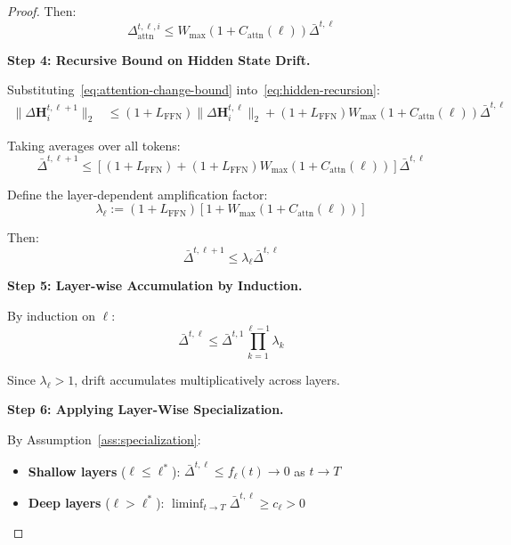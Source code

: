 \documentclass{article} %
\theoremstyle{definition}
\theoremstyle{remark}
\begin{document}
\begin{proof}
Then:
\begin{equation}\label{eq:attention-change-bound}
\Delta_{\text{attn}}^{t,\ell,i} \leq W_{\max}(1 + C_{\text{attn}}(\ell)) \bar{\Delta}^{t,\ell}
\end{equation}

\textbf{Step 4: Recursive Bound on Hidden State Drift.}

Substituting~\eqref{eq:attention-change-bound} into~\eqref{eq:hidden-recursion}:
\begin{align}
\|\Delta\mathbf{H}^{t,\ell+1}_i\|_2 &\leq (1 + L_{\text{FFN}})\|\Delta\mathbf{H}^{t,\ell}_i\|_2 + (1 + L_{\text{FFN}}) W_{\max}(1 + C_{\text{attn}}(\ell)) \bar{\Delta}^{t,\ell}
\end{align}

Taking averages over all tokens:
\begin{equation}
\bar{\Delta}^{t,\ell+1} \leq [(1 + L_{\text{FFN}}) + (1 + L_{\text{FFN}}) W_{\max}(1 + C_{\text{attn}}(\ell))] \bar{\Delta}^{t,\ell}
\end{equation}

Define the layer-dependent amplification factor:
\begin{equation}
\lambda_{\ell} := (1 + L_{\text{FFN}})[1 + W_{\max}(1 + C_{\text{attn}}(\ell))]
\end{equation}

Then:
\begin{equation}
\bar{\Delta}^{t,\ell+1} \leq \lambda_{\ell} \bar{\Delta}^{t,\ell}
\end{equation}

\textbf{Step 5: Layer-wise Accumulation by Induction.}

By induction on $\ell$:
\begin{equation}
\bar{\Delta}^{t,\ell} \leq \bar{\Delta}^{t,1} \prod_{k=1}^{\ell-1} \lambda_k
\end{equation}

Since $\lambda_{\ell} > 1$, drift accumulates multiplicatively across layers.

\textbf{Step 6: Applying Layer-Wise Specialization.}

By Assumption~\ref{ass:specialization}:
\begin{itemize}
\item \textbf{Shallow layers} ($\ell \leq \ell^*$): $\bar{\Delta}^{t,\ell} \leq f_{\ell}(t) \to 0$ as $t \to T$
\item \textbf{Deep layers} ($\ell > \ell^*$): $\liminf_{t \to T} \bar{\Delta}^{t,\ell} \geq c_{\ell} > 0$
\end{itemize}


\end{proof}
\end{document}
